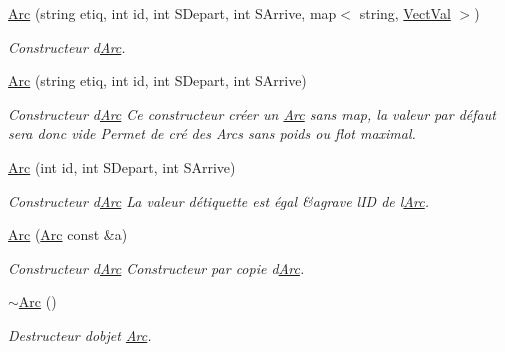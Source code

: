 \begin{DoxyCompactItemize}
\item 
\hyperlink{classArc_a9cf4b0264dc2409aafb36e6c2af7f7ff}{Arc} (string etiq, int id, int S\+Depart, int S\+Arrive, map$<$ string, \hyperlink{structVectVal}{Vect\+Val} $>$)
\begin{DoxyCompactList}\small\item\em Constructeur d\textquotesingle{}\hyperlink{classArc}{Arc}. \end{DoxyCompactList}\item 
\hyperlink{classArc_a763277fd3074b9edc16540182c87ca28}{Arc} (string etiq, int id, int S\+Depart, int S\+Arrive)
\begin{DoxyCompactList}\small\item\em Constructeur d\textquotesingle{}\hyperlink{classArc}{Arc} Ce constructeur cr\'{e}er un \hyperlink{classArc}{Arc} sans map, la valeur par défaut sera donc vide Permet de cr\'{e} des Arcs sans poids ou flot maximal. \end{DoxyCompactList}\item 
\hyperlink{classArc_a81afb0a10916686b0f6091affbdaa03f}{Arc} (int id, int S\+Depart, int S\+Arrive)
\begin{DoxyCompactList}\small\item\em Constructeur d\textquotesingle{}\hyperlink{classArc}{Arc} La valeur d\textquotesingle{}\'{e}tiquette est \'{e}gal \&agrave l\textquotesingle{}ID de l\textquotesingle{}\hyperlink{classArc}{Arc}. \end{DoxyCompactList}\item 
\hyperlink{classArc_adc567f6d1ee57cde2c9c92c3c44d920a}{Arc} (\hyperlink{classArc}{Arc} const \&a)
\begin{DoxyCompactList}\small\item\em Constructeur d\textquotesingle{}\hyperlink{classArc}{Arc} Constructeur par copie d\textquotesingle{}\hyperlink{classArc}{Arc}. \end{DoxyCompactList}\item 
\mbox{\label{classArc_a69a956d1ca0b11f463bdc71d0d16c8c1}} 
\hyperlink{classArc_a69a956d1ca0b11f463bdc71d0d16c8c1}{$\sim$\+Arc} ()
\begin{DoxyCompactList}\small\item\em Destructeur d\textquotesingle{}objet \hyperlink{classArc}{Arc}. \end{DoxyCompactList}\item 
\mbox{\label{classArc_aa2064bd363e215555a27c75bfaf77f68}} 

\end{DoxyCompactItemize}
